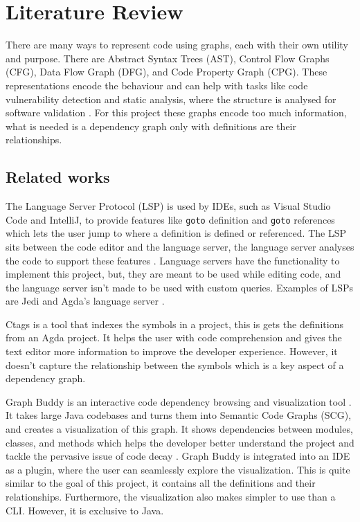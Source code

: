 
\chapter{Literature Review}



There are many ways to represent code using graphs, each with their own utility
and purpose. There are Abstract Syntax Trees (AST), Control Flow Graphs (CFG),
Data Flow Graph (DFG), and Code Property Graph (CPG). These representations
encode the behaviour and can help with tasks like code vulnerability detection
\cite{graph_for_code_vuln} and static analysis, where the structure is analysed
for software validation \cite{static_analysis}. For this project these graphs
encode too much information, what is needed is a dependency graph only with
definitions are their relationships.


\section{Related works}

The Language Server Protocol (LSP) is used by IDEs, such as Visual Studio Code
and IntelliJ, to provide features like \texttt{goto} definition and
\texttt{goto} references which lets the user jump to where a definition is
defined or referenced. The LSP sits between the code editor and the language
server, the language server analyses the code to support these features
\cite{LSP_implementation}. Language servers have the functionality to implement
this project, but, they are meant to be used while editing code, and the
language server isn't made to be used with custom queries. Examples of LSPs are
Jedi \cite{jedi_lsp} and Agda's language server \cite{agda_lsp}.

Ctags \cite{ctags} is a tool that indexes the symbols in a project, this is
gets the definitions from an Agda project. It helps the user with
code comprehension and gives the text editor more information to improve the
developer experience. However, it doesn't capture the relationship between the
symbols which is a key aspect of a dependency graph.

Graph Buddy is an interactive code dependency browsing and visualization tool
\cite{graph_buddy}. It takes large Java codebases and turns them into Semantic
Code Graphs (SCG), and creates a visualization of this graph. It shows
dependencies between modules, classes, and methods which helps the developer
better understand the project and tackle the pervasive issue of code decay
\cite{code_decay_evidence}. Graph Buddy is integrated into an IDE as a plugin,
where the user can seamlessly explore the visualization. This is quite similar
to the goal of this project, it contains all the definitions and their
relationships. Furthermore, the visualization also makes simpler to use
than a CLI. However, it is exclusive to Java.


